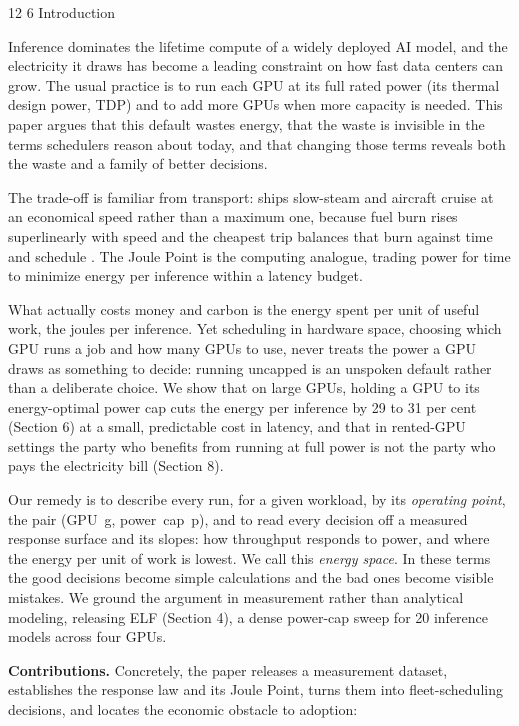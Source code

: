 \documentclass[3p,twocolumn]{elsarticle}
\makeatletter
\renewcommand\section{\@startsection{section}{1}{\z@}%
           {12\p@ \@plus 4\p@ \@minus 4\p@}%
           {6\p@ \@plus 4\p@ \@minus 3\p@}%
           {\normalsize\bfseries\boldmath}}
\makeatother
\begin{document}
\section{Introduction}\label{introduction}

Inference dominates the lifetime compute of a widely deployed AI model, and the electricity it
draws has become a leading constraint on how fast data centers can grow. The usual practice is to run each GPU
at its full rated power (its thermal design power, TDP) and to add more GPUs when more capacity is needed. This
paper argues that this default wastes energy, that the waste is invisible in the terms schedulers reason about
today, and that changing those terms reveals both the waste and a family of better decisions.

The trade-off is familiar from transport: ships slow-steam and aircraft cruise at an economical speed rather
than a maximum one, because fuel burn rises superlinearly with speed and the cheapest trip balances that burn
against time and schedule \cite{ref59, ref60}. The Joule Point is the computing analogue, trading power for time to
minimize energy per inference within a latency budget.

What actually costs money and carbon is the energy spent per unit of useful work, the joules per inference.
Yet scheduling in hardware space, choosing which GPU runs a job and how many GPUs to use, never treats the
power a GPU draws as something to decide: running uncapped is an unspoken default rather than a deliberate
choice. We show that on large GPUs, holding a GPU to its energy-optimal power cap cuts the energy per inference
by 29 to 31 per cent (Section 6) at a small, predictable cost in latency, and that
in rented-GPU settings the party who benefits from running at full power is not the party who pays the electricity bill (Section 8).

Our remedy is to describe every run, for a given workload, by its \emph{operating point}, the pair (GPU~g, power~cap~p),
and to read every decision off a measured response surface and its slopes: how
throughput responds to power, and where the energy per unit of work is lowest. We call this \emph{energy
space}. In these terms the good decisions become simple calculations and the bad ones become visible
mistakes. We ground the argument in measurement rather than analytical modeling, releasing ELF (Section 4), a
dense power-cap sweep for 20 inference models across four GPUs.

\textbf{Contributions.} Concretely, the paper releases a measurement dataset, establishes the response law and
its Joule Point, turns them into fleet-scheduling decisions, and locates the economic obstacle to adoption:
\end{document}
